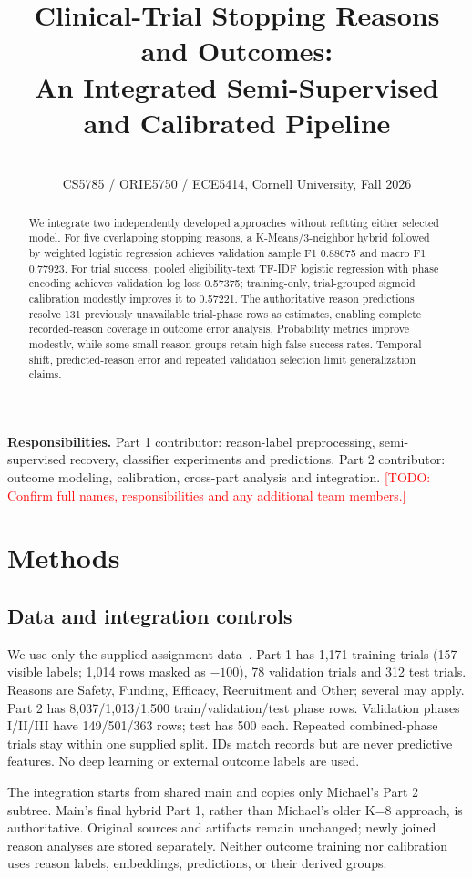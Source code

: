 \documentclass[10pt,twocolumn,letterpaper]{article}
\title{Clinical-Trial Stopping Reasons and Outcomes:\\An Integrated Semi-Supervised and Calibrated Pipeline}
\author{\todo{Part 1 contributor: full name} \and \todo{Part 2 contributor: full name}\\
CS5785 / ORIE5750 / ECE5414, Cornell University, Fall 2026}
\newcommand{\todo}[1]{\textcolor{red}{[TODO: #1]}}
\begin{document}
\maketitle
\noindent\textbf{Responsibilities.} Part 1 contributor: reason-label preprocessing,
semi-supervised recovery, classifier experiments and predictions. Part 2 contributor:
outcome modeling, calibration, cross-part analysis and integration.
\todo{Confirm full names, responsibilities and any additional team members.}

\begin{abstract}
We integrate two independently developed approaches without refitting either
selected model. For five overlapping stopping reasons, a K-Means/3-neighbor
hybrid followed by weighted logistic regression achieves validation sample F1
0.88675 and macro F1 0.77923. For trial success, pooled eligibility-text TF-IDF
logistic regression with phase encoding achieves validation log loss 0.57375;
training-only, trial-grouped sigmoid calibration modestly improves it to 0.57221.
The authoritative reason predictions resolve 131 previously unavailable
trial-phase rows as estimates, enabling complete recorded-reason coverage in
outcome error analysis. Probability metrics improve modestly, while some small
reason groups retain high false-success rates. Temporal shift, predicted-reason
error and repeated validation selection limit generalization claims.
\end{abstract}

\section{Methods}
\subsection{Data and integration controls}
We use only the supplied assignment data~\cite{assignment}. Part 1 has 1,171
training trials (157 visible labels; 1,014 rows masked as $-100$), 78 validation
trials and 312 test trials. Reasons are Safety, Funding, Efficacy, Recruitment
and Other; several may apply. Part 2 has 8,037/1,013/1,500 train/validation/test
phase rows. Validation phases I/II/III have 149/501/363 rows; test has 500 each.
Repeated combined-phase trials stay within one supplied split. IDs match records
but are never predictive features. No deep learning or external outcome labels
are used.

The integration starts from shared main and copies only Michael's Part 2
subtree. Main's final hybrid Part 1, rather than Michael's older K=8 approach,
is authoritative. Original sources and artifacts remain unchanged; newly joined
reason analyses are stored separately. Neither outcome training nor calibration
uses reason labels, embeddings, predictions, or their derived groups.
\end{document}
